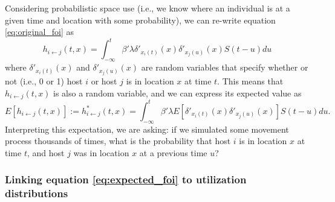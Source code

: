 \documentclass[letterpaper]{article}
\begin{document}
Considering probabilistic space use (i.e., we know where an individual is at a given time and location with some probability), we can re-write equation \ref{eq:original_foi} as
\begin{equation}
    h_{i \leftarrow j}(t, x) = \int_{-\infty}^{t} \beta' \lambda \delta'_{x_i(t)}(x) \delta'_{x_j(u)}(x) S(t - u) du
    \label{eq:prob_foi}
\end{equation}
where $\delta'_{x_i(t)}(x)$ and $\delta'_{x_j(u)}(x)$ are random variables that specify whether or not (i.e., 0 or 1) host $i$ or host $j$ is in location $x$ at time $t$.  This means that $h_{i \leftarrow j}(t, x)$ is also a random variable, and we can express its expected value as 
\begin{equation}
    E[h_{i \leftarrow j}(t, x)] := h^*_{i \leftarrow j}(t, x) = \int_{-\infty}^{t} \beta' \lambda E[\delta'_{x_i(t)}(x) \delta'_{x_j(u)}(x)] S(t - u) du.
    \label{eq:expected_foi}
\end{equation}
Interpreting this expectation, we are asking: if we simulated some movement process thousands of times, what is the probability that host $i$ is in location $x$ at time $t$, and host $j$ was in location $x$ at a previous time $u$? 

\subsubsection*{Linking equation \ref{eq:expected_foi} to utilization distributions}
\end{document}
